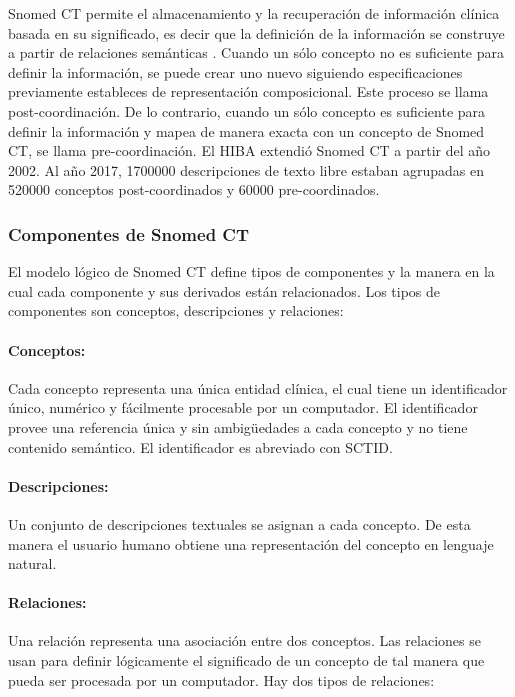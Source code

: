 Snomed CT permite el almacenamiento y la recuperación de información clínica basada en su significado, es decir que la definición de la información se construye a partir de relaciones semánticas \cite{Rector,Bhattacharyya2016,ihtsdo2016SG}. Cuando un sólo concepto no es suficiente para definir la información, se puede crear uno nuevo siguiendo especificaciones previamente estableces de representación composicional. Este proceso se llama post-coordinación. De lo contrario, cuando un sólo concepto es suficiente para definir la información y mapea de manera exacta con un concepto de Snomed CT, se llama pre-coordinación. El \acrshort{HIBA} extendió Snomed CT a partir del año 2002. Al año \num{2017}, \num{1700000} descripciones de texto libre estaban agrupadas en \num{520000} conceptos post-coordinados y \num{60000} pre-coordinados. 

\subsubsection{Componentes de Snomed CT}
El modelo lógico de Snomed CT define tipos de componentes y la manera en la cual cada componente  y sus derivados están relacionados. Los tipos de componentes son conceptos, descripciones y relaciones:\cite{ihtsdo2016SG}

\paragraph{Conceptos:}
Cada concepto representa una única entidad clínica, el cual tiene un identificador único, numérico y fácilmente procesable por un computador. El identificador provee una referencia única y sin ambigüedades a cada concepto y no tiene contenido semántico. El identificador es abreviado con SCTID.\cite{ihtsdo2016SG}

\paragraph{Descripciones:}
Un conjunto de descripciones textuales se asignan a cada concepto. De esta manera el usuario humano obtiene una representación del concepto en lenguaje natural.

\paragraph{Relaciones:}
Una relación representa una asociación entre dos conceptos. Las relaciones se usan para definir lógicamente el significado de un concepto de tal manera que pueda ser procesada por un computador. Hay dos tipos de relaciones:

